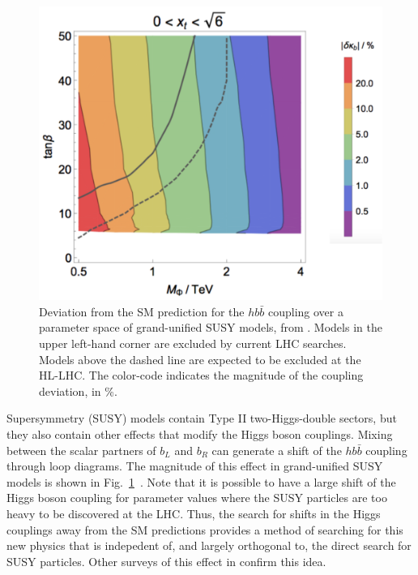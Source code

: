 \begin{figure}
\begin{center}
\includegraphics[width=0.90\hsize]{chapters/figures/WellsZhang.pdf}
\end{center}
\caption{Deviation from the SM prediction for the $hb\bar b$ 
coupling over a parameter space of grand-unified SUSY models, from \cite{Wells:2017vla}.   
Models in the upper left-hand corner are excluded by current LHC searches.  
Models above the dashed line are expected to be excluded at the  HL-LHC. 
The color-code indicates the magnitude of the coupling deviation, in \%. }
\label{fig:WellsZhang}
\end{figure}


Supersymmetry (SUSY) models contain Type II  two-Higgs-double sectors, but they also contain other effects that modify the Higgs boson couplings.   Mixing between the scalar partners of $b_L$ and $b_R$ can generate a shift of the $hb\bar b$ coupling through loop diagrams.  The magnitude of this effect in 
grand-unified SUSY models is shown in 
Fig.~\ref{fig:WellsZhang}~\cite{Wells:2017vla}.   
Note that it is possible to have a large shift of the Higgs boson coupling for 
parameter values where the SUSY particles are too
heavy to be discovered at the LHC.   Thus, the search for shifts in the Higgs couplings away from the SM predictions provides a method of searching for this new physics that is indepedent of, and largely orthogonal to, the direct search for SUSY particles.   Other surveys of this effect in \cite{Cahill-Rowley:2014wba,Kanemura:2015mxa}  confirm this idea.

